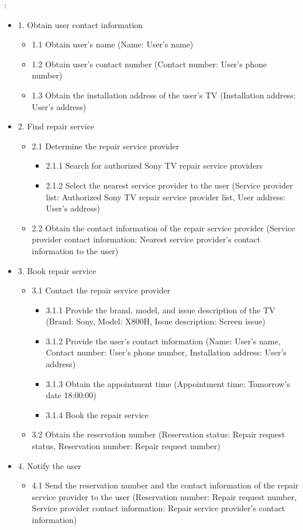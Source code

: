 :
\begin{itemize}
    \item 1. Obtain user contact information
    \begin{itemize}
        \item 1.1 Obtain user's name (Name: User's name)
        \item 1.2 Obtain user's contact number (Contact number: User's phone number)
        \item 1.3 Obtain the installation address of the user's TV (Installation address: User's address)
    \end{itemize}
    \item 2. Find repair service
    \begin{itemize}
        \item 2.1 Determine the repair service provider
        \begin{itemize}
            \item 2.1.1 Search for authorized Sony TV repair service providers
            \item 2.1.2 Select the nearest service provider to the user (Service provider list: Authorized Sony TV repair service provider list, User address: User's address)
        \end{itemize}
        \item 2.2 Obtain the contact information of the repair service provider (Service provider contact information: Nearest service provider's contact information to the user)
    \end{itemize}
    \item 3. Book repair service
    \begin{itemize}
        \item 3.1 Contact the repair service provider
        \begin{itemize}
            \item 3.1.1 Provide the brand, model, and issue description of the TV (Brand: Sony, Model: X800H, Issue description: Screen issue)
            \item 3.1.2 Provide the user's contact information (Name: User's name, Contact number: User's phone number, Installation address: User's address)
            \item 3.1.3 Obtain the appointment time (Appointment time: Tomorrow's date 18:00:00)
            \item 3.1.4 Book the repair service
        \end{itemize}
        \item 3.2 Obtain the reservation number (Reservation status: Repair request status, Reservation number: Repair request number)
    \end{itemize}
    \item 4. Notify the user
    \begin{itemize}
        \item 4.1 Send the reservation number and the contact information of the repair service provider to the user (Reservation number: Repair request number, Service provider contact information: Repair service provider's contact information)
    \end{itemize}
\end{itemize}

